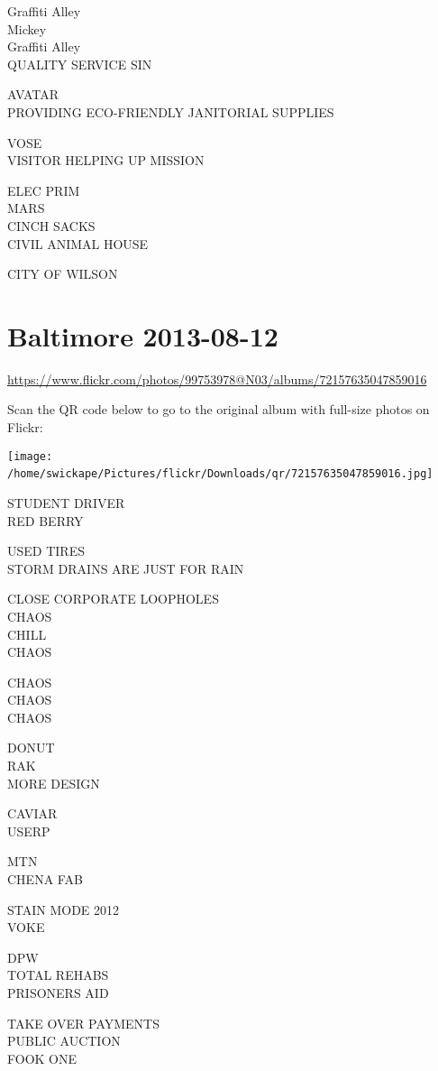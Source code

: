 \documentclass[10pt,letterpaper]{article}
\begin{document}
Graffiti Alley\\
Mickey\\
Graffiti Alley\\
QUALITY SERVICE SIN

AVATAR\\
PROVIDING ECO{-}FRIENDLY JANITORIAL SUPPLIES

VOSE\\
VISITOR HELPING UP MISSION

ELEC PRIM\\
MARS\\
CINCH SACKS\\
CIVIL ANIMAL HOUSE

CITY OF WILSON
\

\section*{Baltimore 2013-08-12}

\url{https://www.flickr.com/photos/99753978@N03/albums/72157635047859016}

Scan the QR code below to go to the original album with full-size photos on Flickr:

\texttt{[image: /home/swickape/Pictures/flickr/Downloads/qr/72157635047859016.jpg]}
\

STUDENT DRIVER\\
RED BERRY

USED TIRES\\
STORM DRAINS ARE JUST FOR RAIN

CLOSE CORPORATE LOOPHOLES\\
CHAOS\\
CHILL\\
CHAOS

CHAOS\\
CHAOS\\
CHAOS

DONUT\\
RAK\\
MORE DESIGN

CAVIAR\\
USERP

MTN\\
CHENA FAB

STAIN MODE 2012\\
VOKE

DPW\\
TOTAL REHABS\\
PRISONERS AID

TAKE OVER PAYMENTS\\
PUBLIC AUCTION\\
FOOK ONE
\end{document}
